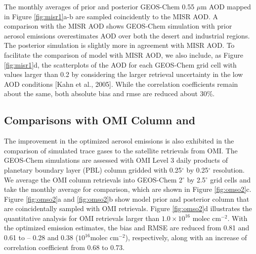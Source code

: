  The monthly averages of prior and posterior GEOS-Chem 0.55 $\mu$m AOD
 mapped in Figure \ref{fig:misr1}a-b are sampled coincidently to the MISR AOD.
 A comparison with the MISR AOD shows GEOS-Chem simulation with prior aerosol emissions
 overestimates AOD over both the desert and industrial regions.
 The posterior simulation is slightly more in agreement with MISR AOD.
 To facilitate the comparison of model with MISR AOD, we also include, as Figure \ref{fig:misr1}d,
 the scatterplots of the AOD for each GEOS-Chem grid cell with values larger than 0.2
 by considering the larger retrieval uncertainty in the low AOD conditions [Kahn et al., 2005].
 While the correlation coefficients remain about the same,
 both absolute bias and rmse are reduced about 30\%.

 \subsection{Comparisons with OMI Column  and }

 The improvement in the optimized aerosol emissions is also exhibited
 in the comparison of simulated trace gases to the satellite retrievals from OMI.
 The GEOS-Chem  simulations are assessed with OMI Level 3 daily products
 of planetary boundary layer (PBL)  column gridded
 with 0.25$^{\circ}$ by 0.25$^{\circ}$ resolution.
 We average the OMI  column retrievals into GEOS-Chem 2$^{\circ}$ by 2.5$^{\circ}$ grid cells
 and take the monthly average for comparison, which are shown in Figure \ref{fig:omso2}c.
 Figure \ref{fig:omso2}a and \ref{fig:omso2}b show model prior and posterior  column
 that are coincidentally sampled with OMI retrievals.
 Figure \ref{fig:omso2}d illustrates the quantitative analysis for OMI  retrievals
 larger than $1.0 \times 10^{16}$ molec cm$^{-2}$.
 With the optimized emission estimates, the bias and RMSE are reduced
 from 0.81 and 0.61 to – 0.28 and 0.38 ($10^{16}$molec cm$^{-2}$), respectively,
 along with an increase of correlation coefficient from 0.68 to 0.73. 

